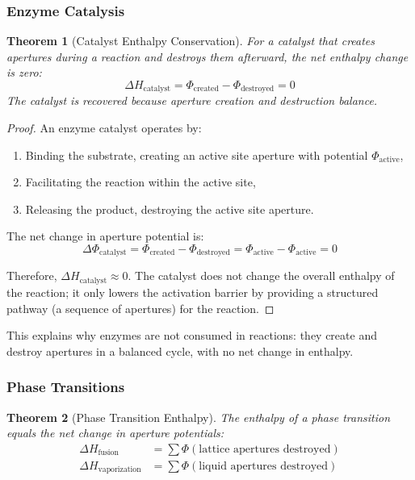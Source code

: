 \documentclass[12pt,a4paper]{article}
\newtheorem{theorem}{Theorem}[section]
\theoremstyle{definition}
\theoremstyle{remark}
\begin{document}
\subsubsection{Enzyme Catalysis}

\begin{theorem}[Catalyst Enthalpy Conservation]
\label{thm:catalyst_enthalpy}
For a catalyst that creates apertures during a reaction and destroys them afterward, the net enthalpy change is zero:
\begin{equation}
\Delta H_{\text{catalyst}} = \Phi_{\text{created}} - \Phi_{\text{destroyed}} = 0
\end{equation}
The catalyst is recovered because aperture creation and destruction balance.
\end{theorem}

\begin{proof}
An enzyme catalyst operates by:
\begin{enumerate}
    \item Binding the substrate, creating an active site aperture with potential $\Phi_{\text{active}}$,
    \item Facilitating the reaction within the active site,
    \item Releasing the product, destroying the active site aperture.
\end{enumerate}

The net change in aperture potential is:
\begin{equation}
\Delta\Phi_{\text{catalyst}} = \Phi_{\text{created}} - \Phi_{\text{destroyed}} = \Phi_{\text{active}} - \Phi_{\text{active}} = 0
\end{equation}

Therefore, $\Delta H_{\text{catalyst}} \approx 0$. The catalyst does not change the overall enthalpy of the reaction; it only lowers the activation barrier by providing a structured pathway (a sequence of apertures) for the reaction.
\end{proof}

This explains why enzymes are not consumed in reactions: they create and destroy apertures in a balanced cycle, with no net change in enthalpy.

\subsubsection{Phase Transitions}

\begin{theorem}[Phase Transition Enthalpy]
\label{thm:phase_transition}
The enthalpy of a phase transition equals the net change in aperture potentials:
\begin{align}
\Delta H_{\text{fusion}} &= \sum \Phi(\text{lattice apertures destroyed}) \\
\Delta H_{\text{vaporization}} &= \sum \Phi(\text{liquid apertures destroyed})
\end{align}
\end{theorem}
\end{document}
